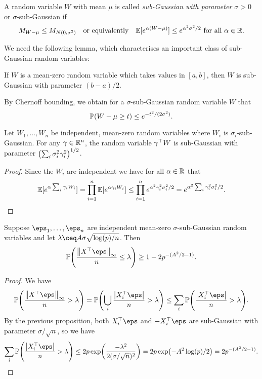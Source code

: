 \begin{definition}
	A random variable  $W$ with mean $\mu$ is called \emph{sub-Gaussian with parameter $\sigma > 0$} or $\sigma$-sub-Gaussian if 
	\[
	M_{W - \mu} \leq M_{N(0, \sigma^2)} \quad\text{or equivalently}\quad \mathbb E[e^{\alpha(W - \mu)}] \leq e^{\alpha^2\sigma^2/2} \text{ for all $\alpha \in \mathbb R$}. 
	\]
\end{definition}

We need the following lemma, which characterises an important class of sub-Gaussian random variables:
\begin{lemma}[Hoeffding]
	If $W$ is a mean-zero random variable which takes values in $[a, b]$, then $W$ is sub-Gaussian with parameter $(b-a)/2$. 
\end{lemma}

By Chernoff bounding, we obtain for a $\sigma$-sub-Gaussian random variable $W$ that \[\mathbb P(W - \mu \geq t) \leq e^{-t^2/(2\sigma^2)}.\]

\begin{proposition}
	Let $W_1, \dotsc, W_n$ be independent, mean-zero random variables where $W_i$ is $\sigma_i$-sub-Gaussian. For any $\gamma \in \mathbb R^n$, the random variable $\gamma^\top W$ is sub-Gaussian with parameter $\qty(\sum_i \sigma_i^2\gamma_i^2)^{1/2}$.
\end{proposition}
\begin{proof}
	Since the $W_i$ are independent we have for all $\alpha \in \mathbb R$ that
	\begin{align*}
		\mathbb E[e^{\alpha \sum_i \gamma_i W_i}] = \prod_{i=1}^n \mathbb E[e^{\alpha \gamma_i W_i}]  \leq \prod_{i=1}^n e^{\alpha^2\gamma_i^2\sigma_i^2/2} = e^{\alpha^2 \sum_i \gamma_i^2\sigma_i^2/2}.
	\end{align*}
\end{proof}

\begin{lemma} \label{lem:probability_omega_bound}
	Suppose $\eps_1, \dotsc, \eps_n$ are independent mean-zero $\sigma$-sub-Gaussian random variables and let $\lambda \ceq A\sigma \sqrt{\log(p)/n}$. Then
	\[
	\PP\qty(\frac{\norm{X\T\eps}_\infty}{n} \leq \lambda) \geq 1 - 2p^{-(A^2/2 - 1)}. 
	\]
\end{lemma}

\begin{proof}
	We have
	\[
	\PP\qty(\frac{\norm{X\T\eps}_\infty}{n} > \lambda) = \PP\qty(\bigcup_i \frac{\abs{X_i\T\eps}}{n} > \lambda) \leq \sum_i \PP\qty(\frac{\abs{X_i\T\eps}}{n} > \lambda). 
	\]
	By the previous proposition, both $X_i\T\eps$ and $-X_i\T\eps$ are sub-Gaussian with parameter $\sigma/\sqrt n$, so we have
	\[
	\sum_i \PP\qty(\frac{\abs{X_i\T\eps}}{n} > \lambda) \leq 2p \exp(\frac{-\lambda^2}{2(\sigma/\sqrt n)^2}) = 2p\exp(-A^2\log(p)/2) = 2 p^{-(A^2/2 - 1)}.
	\]
\end{proof}

